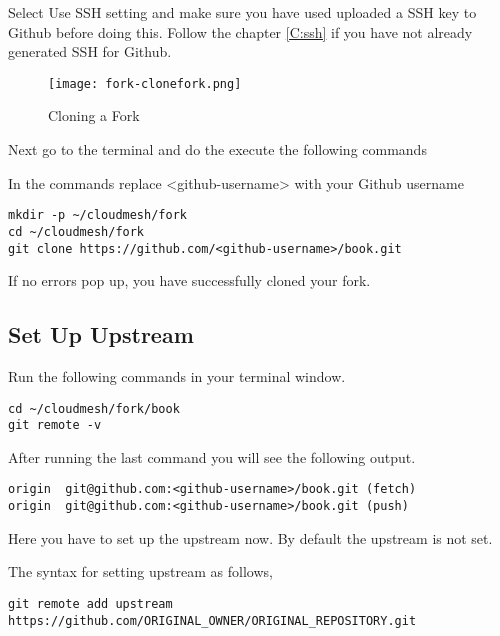 \begin{NOTE}
  Select Use SSH setting and make sure you have used uploaded a
  SSH key to Github before doing this. Follow the chapter \ref{C:ssh} if you have not already generated SSH for Github.
\end{NOTE}


\begin{figure}[htb]\label{fig:clonemyfork}
\centering
\texttt{[image: fork-clonefork.png]}
\caption{Cloning a Fork
}
\end{figure}

Next go to the terminal and do the execute the following commands

\begin{NOTE}
 In the commands replace <github-username> with your Github username
\end{NOTE}

\begin{lstlisting}
mkdir -p ~/cloudmesh/fork
cd ~/cloudmesh/fork
git clone https://github.com/<github-username>/book.git  
\end{lstlisting}

If no errors pop up, you have successfully cloned your fork.

\subsection{Set Up Upstream}

Run the following commands in your terminal window.

\begin{lstlisting}
cd ~/cloudmesh/fork/book
git remote -v
\end{lstlisting}

After running the last command you will see the following
output.

\begin{lstlisting}
origin	git@github.com:<github-username>/book.git (fetch)
origin	git@github.com:<github-username>/book.git (push) 
\end{lstlisting}

Here you have to set up the upstream now. By default the upstream is
not set.

The syntax for setting upstream as follows,

\begin{lstlisting}
git remote add upstream https://github.com/ORIGINAL_OWNER/ORIGINAL_REPOSITORY.git
\end{lstlisting}

